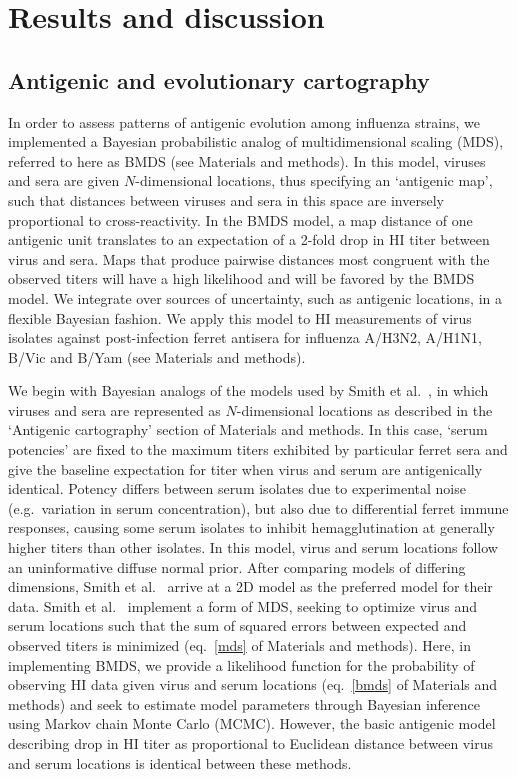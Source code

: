 \documentclass[11pt,oneside,letterpaper]{article}
\begin{document}
\section*{Results and discussion}

\subsection*{Antigenic and evolutionary cartography}

In order to assess patterns of antigenic evolution among influenza strains, we implemented a Bayesian probabilistic analog of multidimensional scaling (MDS), referred to here as BMDS (see Materials and methods).
In this model, viruses and sera are given $N$-dimensional locations, thus specifying an `antigenic map', such that distances between viruses and sera in this space are inversely proportional to cross-reactivity.
In the BMDS model, a map distance of one antigenic unit translates to an expectation of a 2-fold drop in HI titer between virus and sera.
Maps that produce pairwise distances most congruent with the observed titers will have a high likelihood and will be favored by the BMDS model.
We integrate over sources of uncertainty, such as antigenic locations, in a flexible Bayesian fashion.
We apply this model to HI measurements of virus isolates against post-infection ferret antisera for influenza A/H3N2, A/H1N1, B/Vic and B/Yam (see Materials and methods).
 
We begin with Bayesian analogs of the models used by Smith et al.\ \cite{Smith04}, in which viruses and sera are represented as $N$-dimensional locations as described in the `Antigenic cartography' section of Materials and methods.
In this case, `serum potencies' are fixed to the maximum titers exhibited by particular ferret sera and give the baseline expectation for titer when virus and serum are antigenically identical.
Potency differs between serum isolates due to experimental noise (e.g.\ variation in serum concentration), but also due to differential ferret immune responses, causing some serum isolates to inhibit hemagglutination at generally higher titers than other isolates.
In this model, virus and serum locations follow an uninformative diffuse normal prior. 
After comparing models of differing dimensions, Smith et al.\ \cite{Smith04} arrive at a 2D model as the preferred model for their data.
Smith et al.\ \cite{Smith04} implement a form of MDS, seeking to optimize virus and serum locations such that the sum of squared errors between expected and observed titers is minimized (eq.\ \ref{mds} of Materials and methods).
Here, in implementing BMDS, we provide a likelihood function for the probability of observing HI data given virus and serum locations (eq.\ \ref{bmds} of Materials and methods) and seek to estimate model parameters through Bayesian inference using Markov chain Monte Carlo (MCMC).
However, the basic antigenic model describing drop in HI titer as proportional to Euclidean distance between virus and serum locations is identical between these methods.
\end{document}
